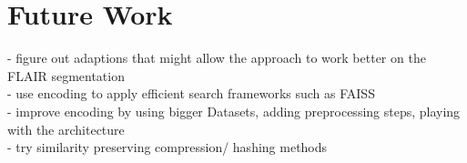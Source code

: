 
\chapter{Future Work}\label{chapter:future_work}

- figure out adaptions that might allow the approach to work better on the FLAIR segmentation \\
- use encoding to apply efficient search frameworks such as FAISS \\
- improve encoding by using bigger Datasets, adding preprocessing steps, playing with the architecture \\
- try similarity preserving compression/ hashing methods \\
